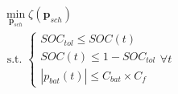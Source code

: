 \begin{equation}
\begin{split}
	&\min_{\textbf{p}_{sch}}\zeta(\textbf{p}_{sch}) \\
	&\text{ s.t. }
	\begin{cases}
		SOC_{tol} \leq SOC(t)\\
		SOC(t) \leq 1-SOC_{tol}\\
		|p_{bat}(t)| \leq C_{bat} \times C_{f}
	\end{cases}
	\forall t
\end{split}
\label{ch2:equ:cost-minimisation}
\end{equation}